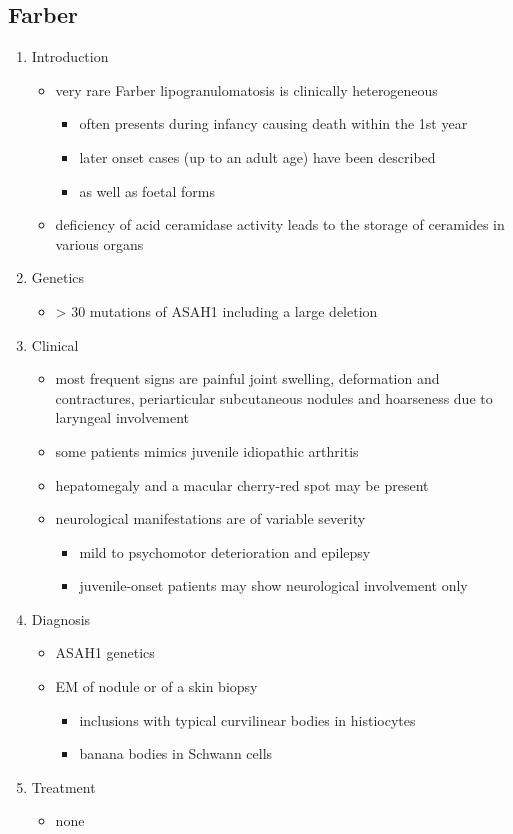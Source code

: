 \documentclass{scrartcl}
\begin{document}
\subsection{Farber}
\label{sec:orgfbf259d}
\begin{enumerate}
\item Introduction
\label{sec:org0af787a}
\begin{itemize}
\item very rare Farber lipogranulomatosis is clinically heterogeneous
\begin{itemize}
\item often presents during infancy causing death within the 1st year
\item later onset cases (up to an adult age) have been described
\item as well as foetal forms
\end{itemize}
\item deficiency of acid ceramidase activity leads to the storage of
ceramides in various organs
\end{itemize}
\item Genetics
\label{sec:orgdb780fa}
\begin{itemize}
\item \textgreater{} 30 mutations of ASAH1 including a large deletion
\end{itemize}
\item Clinical
\label{sec:orgeed5275}
\begin{itemize}
\item most frequent signs are painful joint swelling, deformation and contractures, periarticular subcutaneous nodules and hoarseness due to laryngeal involvement
\item some patients mimics juvenile idiopathic arthritis
\item hepatomegaly and a macular cherry-red spot may be present
\item neurological manifestations are of variable severity
\begin{itemize}
\item mild to psychomotor deterioration and epilepsy
\item juvenile-onset patients may show neurological involvement only
\end{itemize}
\end{itemize}

\item Diagnosis
\label{sec:org6c351f0}
\begin{itemize}
\item ASAH1 genetics
\item EM of nodule or of a skin biopsy
\begin{itemize}
\item inclusions with typical curvilinear bodies in histiocytes
\item banana bodies in Schwann cells
\end{itemize}
\end{itemize}

\item Treatment
\label{sec:org5f02a2c}
\begin{itemize}
\item none
\end{itemize}
\end{enumerate}
\end{document}
